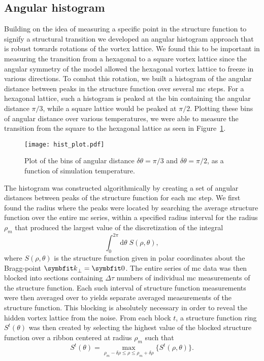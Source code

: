 \subsection{Angular histogram}

Building on the idea of measuring a specific point in the structure function to signify a structural transition we developed an angular histogram approach that is robust towards rotations of the
vortex lattice. We found this to be important in measuring the transition from a hexagonal to a square vortex lattice since the angular symmetry of the model allowed the hexagonal vortex lattice to
freeze in various directions. To combat this rotation, we built a histogram of the angular distance between peaks in the structure function over several \ac{mc} steps. For a hexagonal
lattice, such a histogram is peaked at the bin containing  the angular distance $\pi/3$, while a square lattice would be peaked at $\pi/2$. Plotting these bins of angular distance over various
temperatures, we were able to measure the transition from the square to the hexagonal lattice as seen in Figure~\ref{fig:Vor:Symm:AH:histogram}.

\begin{figure}[h]
    \centering
    \texttt{[image: hist\_plot.pdf]}
    \caption{Plot of the bins of angular distance $\delta\theta = \pi/3$ and $\delta\theta = \pi/2$, as a function of simulation temperature.}
    \label{fig:Vor:Symm:AH:histogram}
\end{figure}

The histogram was constructed algorithmically by creating a set of angular distances between peaks of the structure function for each \ac{mc} step. We first found the radius where the peaks were
located by searching the average structure function over the entire \ac{mc} series, within a specified radius interval for the radius $\rho_m$ that produced the largest value of the
discretization of the integral
\begin{equation}
    \label{eq:Vor:Symm:AH:searchIntegral}
    \int_0^{2\pi}\!\!\!\!\!\!\mathrm{d}\theta\; S(\rho,\theta),
\end{equation}
where $S(\rho,\theta)$ is the structure function given in polar coordinates about the Bragg-point $\v{k}_\perp = \v{0}$. The entire series of \ac{mc} data was then blocked into sections
containing $\Delta\tau$ numbers of individual \ac{mc} measurements of the structure function. Each such interval of structure function measurements were then averaged over to yields separate
averaged measurements of the structure function. This blocking is absolutely necessary in order to reveal the hidden vortex lattice from the noise. From each block $t$,
a structure function ring $S^t(\theta)$ was then created by selecting the highest value of the blocked structure function over a ribbon centered at radius $\rho_m$ such that
\begin{equation}
    \label{eq:Vor:Symm:AH:ribbonMaximum}
    S^t(\theta) = \max_{\rho_m-\delta\rho\leq\rho\leq\rho_m+\delta\rho}\{S^t(\rho,\theta)\}.
\end{equation}

